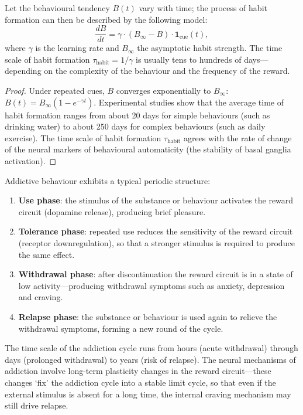 \begin{proposition}\label{prop:habit_formation}
Let the behavioural tendency $B(t)$ vary with time; the process of habit formation can then be described by the following model:
\[
\frac{dB}{dt} = \gamma \cdot (B_{\infty} - B) \cdot \mathbf{1}_{\text{cue}}(t),
\]
where $\gamma$ is the learning rate and $B_{\infty}$ the asymptotic habit strength. The time scale of habit formation $\tau_{\text{habit}} = 1/\gamma$ is usually tens to hundreds of days---depending on the complexity of the behaviour and the frequency of the reward.
\end{proposition}

\begin{proof}
Under repeated cues, $B$ converges exponentially to $B_\infty$: $B(t) = B_\infty (1 - e^{-\gamma t})$. Experimental studies show that the average time of habit formation ranges from about 20 days for simple behaviours (such as drinking water) to about 250 days for complex behaviours (such as daily exercise). The time scale of habit formation $\tau_{\text{habit}}$ agrees with the rate of change of the neural markers of behavioural automaticity (the stability of basal ganglia activation).
\end{proof}

\begin{example}\label{ex:addiction_cycle}
Addictive behaviour exhibits a typical periodic structure:
\begin{enumerate}[label=(\roman*)]
    \item \textbf{Use phase}: the stimulus of the substance or behaviour activates the reward circuit (dopamine release), producing brief pleasure.
    \item \textbf{Tolerance phase}: repeated use reduces the sensitivity of the reward circuit (receptor downregulation), so that a stronger stimulus is required to produce the same effect.
    \item \textbf{Withdrawal phase}: after discontinuation the reward circuit is in a state of low activity---producing withdrawal symptoms such as anxiety, depression and craving.
    \item \textbf{Relapse phase}: the substance or behaviour is used again to relieve the withdrawal symptoms, forming a new round of the cycle.
\end{enumerate}
The time scale of the addiction cycle runs from hours (acute withdrawal) through days (prolonged withdrawal) to years (risk of relapse). The neural mechanisms of addiction involve long-term plasticity changes in the reward circuit---these changes `fix' the addiction cycle into a stable limit cycle, so that even if the external stimulus is absent for a long time, the internal craving mechanism may still drive relapse.
\end{example}

